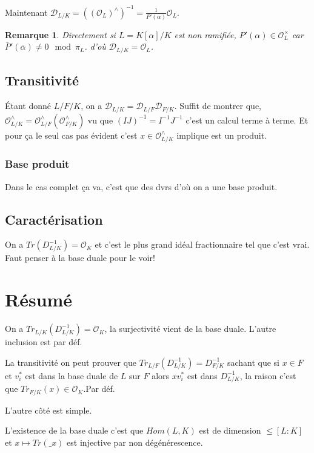 \documentclass[a4paper,12pt]{book}
\newcommand{\Or}{\mathcal{O}}
\newcommand{\D}{\mathscr{D}}
\theoremstyle{plain}
\newtheorem{rem}{Remarque}
\theoremstyle{definition}
\theoremstyle{remark}
\begin{document}
Maintenant $\D_{L/K}=((\Or_L)^\wedge)^{-1}=\frac{1}{P'(\alpha)}\Or_L$.

\begin{rem}
    Directement si $L=K[\alpha]/K$ est non ramifiée, $P'(\alpha)\in \Or_L^\times$
    car $\bar P'(\bar \alpha)\ne 0\mod \pi_L$.
    d'où $\D_{L/K}=\Or_L$.
\end{rem}

\section{Transitivité}
Étant donné $L/F/K$, on a $\D_{L/K}=\D_{L/F}\D_{F/K}$. Suffit de
montrer
que, $\Or_{L/K}^\wedge=\Or_{L/F}^\wedge(\Or_{F/K}^\wedge)$ vu que 
$(IJ)^{-1}=I^{-1}J^{-1}$ c'est un calcul terme à terme. Et pour ça 
le seul cas pas évident c'est $x\in \Or_{L/K}^\wedge$ implique est
un produit.
\subsection{Base produit}
Dans le cas complet ça va, c'est que des dvrs d'où
on a une base produit. 

\section{Caractérisation}
On a $Tr(D_{L/K}^{-1})=\Or_K$ et c'est le plus grand idéal 
fractionnaire tel que c'est vrai. Faut penser à la base
duale pour le voir! 

\chapter{Résumé}
On a $Tr_{L/K}(D_{L/K}^{-1})=\Or_K$, la surjectivité vient de
la base duale. L'autre inclusion est par déf. 

La transitivité on peut prouver que 
$Tr_{L/F}(D_{L/K}^{-1})=D_{F/K}^{-1}$ sachant que si $x\in F$
et $v_i^*$ est dans la base duale de $L$ sur $F$ alors $xv_i^*$ 
est dans $D_{L/K}^{-1}$, la raison c'est que $Tr_{F/K}(x)\in\Or_K$.Par déf.

L'autre côté est simple.

L'existence de la base duale c'est que $Hom(L,K)$ est de
dimension $\leq [L:K]$ et $x\mapsto Tr(\_x)$ est injective par non
dégénérescence.
\end{document}
